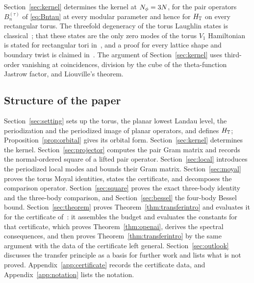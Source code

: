 Section~\ref{sec:kernel} determines the kernel at $N_{\phi}=3N$, for the pair operators $B_n^{(\tau)}$ of \eqref{eq:Bntau} at every
modular parameter and hence for $H_{\mathbb{T}}$ on every rectangular torus. The threefold degeneracy of the torus Laughlin states is
classical~\cite{HaldaneRezayiTorus}; that these states are the only zero modes of the torus $V_1$ Hamiltonian is stated for
rectangular tori in~\cite[Section~II.2]{ONDS}, and a proof for every lattice shape and boundary twist is claimed
in~\cite{HouWu}. The argument of Section~\ref{sec:kernel} uses third-order vanishing at coincidences, division by the cube of
the theta-function Jastrow factor, and Liouville's theorem.

\subsection{Structure of the paper}

Section~\ref{sec:setting} sets up the torus, the planar lowest Landau level, the periodization and the periodized image of planar
operators, and defines $H_{\mathbb{T}}$; Proposition~\ref{prop:orbital} gives its orbital form. Section~\ref{sec:kernel} determines the
kernel. Section~\ref{sec:projector} computes the pair Gram matrix and records the normal-ordered square of a lifted pair
operator. Section~\ref{sec:local} introduces the periodized local modes and bounds their Gram matrix. Section~\ref{sec:moyal}
proves the torus Moyal identities, states the certificate, and decomposes the comparison operator. Section~\ref{sec:square}
proves the exact three-body identity and the three-body comparison, and Section~\ref{sec:bessel} the four-body Bessel bound.
Section~\ref{sec:theorem} proves Theorem~\ref{thm:transferintro} and evaluates it for the certificate
of~\cite{OAI:A-Fock-space-inequality-and-the-Laughlin-spectral-gap-September-24-2026}: it assembles the budget and evaluates the
constants for that certificate, which proves Theorem~\ref{thm:openai}, derives the spectral consequences, and then proves
Theorem~\ref{thm:transferintro} by the same argument with the data of the certificate left general.
Section~\ref{sec:outlook} discusses the transfer principle as a basis for further work and lists what is not proved.
Appendix~\ref{app:certificate} records the certificate data, and Appendix~\ref{app:notation} lists the notation.
